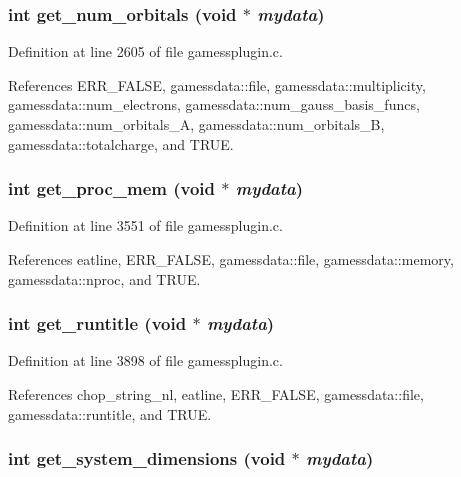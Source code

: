 \subsubsection{\setlength{\rightskip}{0pt plus 5cm}int get\_\-num\_\-orbitals (void $\ast$ {\em mydata})}\label{gamessplugin_8c_a25}




Definition at line 2605 of file gamessplugin.c.

References ERR\_\-FALSE, gamessdata::file, gamessdata::multiplicity, gamessdata::num\_\-electrons, gamessdata::num\_\-gauss\_\-basis\_\-funcs, gamessdata::num\_\-orbitals\_\-A, gamessdata::num\_\-orbitals\_\-B, gamessdata::totalcharge, and TRUE.
\subsubsection{\setlength{\rightskip}{0pt plus 5cm}int get\_\-proc\_\-mem (void $\ast$ {\em mydata})\hspace{0.3cm}{\tt  [static]}}\label{gamessplugin_8c_a31}




Definition at line 3551 of file gamessplugin.c.

References eatline, ERR\_\-FALSE, gamessdata::file, gamessdata::memory, gamessdata::nproc, and TRUE.
\subsubsection{\setlength{\rightskip}{0pt plus 5cm}int get\_\-runtitle (void $\ast$ {\em mydata})\hspace{0.3cm}{\tt  [static]}}\label{gamessplugin_8c_a34}




Definition at line 3898 of file gamessplugin.c.

References chop\_\-string\_\-nl, eatline, ERR\_\-FALSE, gamessdata::file, gamessdata::runtitle, and TRUE.
\subsubsection{\setlength{\rightskip}{0pt plus 5cm}int get\_\-system\_\-dimensions (void $\ast$ {\em mydata})}\label{gamessplugin_8c_a30}




